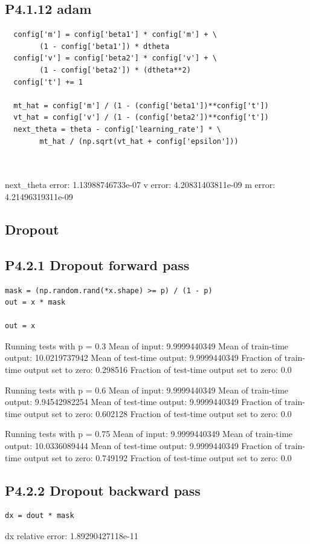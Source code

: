 \documentclass[12pt]{article}
\begin{document}
\subsection*{P4.1.12 adam}
\begin{lstlisting}
  config['m'] = config['beta1'] * config['m'] + \
        (1 - config['beta1']) * dtheta
  config['v'] = config['beta2'] * config['v'] + \
        (1 - config['beta2']) * (dtheta**2)
  config['t'] += 1

  mt_hat = config['m'] / (1 - (config['beta1'])**config['t'])
  vt_hat = config['v'] / (1 - (config['beta2'])**config['t'])
  next_theta = theta - config['learning_rate'] * \
        mt_hat / (np.sqrt(vt_hat + config['epsilon']))



\end{lstlisting}
next\_theta error:  1.13988746733e-07
v error:  4.20831403811e-09
m error:  4.21496319311e-09
\subsection*{Dropout}

\subsection*{P4.2.1 Dropout forward pass}
\begin{lstlisting}
mask = (np.random.rand(*x.shape) >= p) / (1 - p)
out = x * mask

out = x
\end{lstlisting}
Running tests with p =  0.3
Mean of input:  9.9999440349
Mean of train-time output:  10.0219737942
Mean of test-time output:  9.9999440349
Fraction of train-time output set to zero:  0.298516
Fraction of test-time output set to zero:  0.0

Running tests with p =  0.6
Mean of input:  9.9999440349
Mean of train-time output:  9.94542982254
Mean of test-time output:  9.9999440349
Fraction of train-time output set to zero:  0.602128
Fraction of test-time output set to zero:  0.0

Running tests with p =  0.75
Mean of input:  9.9999440349
Mean of train-time output:  10.0336089444
Mean of test-time output:  9.9999440349
Fraction of train-time output set to zero:  0.749192
Fraction of test-time output set to zero:  0.0


\subsection*{P4.2.2 Dropout backward pass}
\begin{lstlisting}
dx = dout * mask
\end{lstlisting}
dx relative error:  1.89290427118e-11
\end{document}
